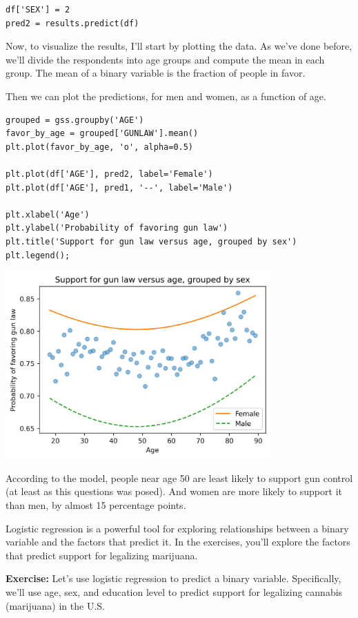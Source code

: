 \begin{lstlisting}[]
df['SEX'] = 2
pred2 = results.predict(df)
\end{lstlisting}

Now, to visualize the results, I'll start by plotting the data. As we've
done before, we'll divide the respondents into age groups and compute
the mean in each group. The mean of a binary variable is the fraction of
people in favor.

Then we can plot the predictions, for men and women, as a function of
age.

\begin{lstlisting}[]
grouped = gss.groupby('AGE')
favor_by_age = grouped['GUNLAW'].mean()
plt.plot(favor_by_age, 'o', alpha=0.5)

plt.plot(df['AGE'], pred2, label='Female')
plt.plot(df['AGE'], pred1, '--', label='Male')

plt.xlabel('Age')
plt.ylabel('Probability of favoring gun law')
plt.title('Support for gun law versus age, grouped by sex')
plt.legend();
\end{lstlisting}

\begin{center}
\includegraphics[width=4in]{chapters/10_regression_files/10_regression_83_0.png}
\end{center}

According to the model, people near age 50 are least likely to support
gun control (at least as this questions was posed). And women are more
likely to support it than men, by almost 15 percentage points.

Logistic regression is a powerful tool for exploring relationships
between a binary variable and the factors that predict it. In the
exercises, you'll explore the factors that predict support for
legalizing marijuana.

\textbf{Exercise:} Let's use logistic regression to predict a binary
variable. Specifically, we'll use age, sex, and education level to
predict support for legalizing cannabis (marijuana) in the U.S.

